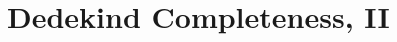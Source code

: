 \documentclass[main.tex]{subfiles}
\begin{document}
\section{Dedekind Completeness, II}
%
%
%
\clearpage
\end{document}
